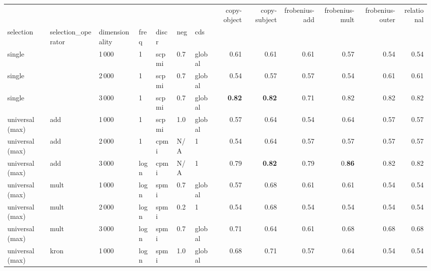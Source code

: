 \begin{tabular}{lllllllrrrrrr}
\toprule
       & {} &      &   &      &     &   &  copy-object &  copy-subject &  frobenius-add &  frobenius-mult &  frobenius-outer &  relational \\
selection & selection\_operator & dimensionality & freq & discr & neg & cds &              &               &                &                 &                  &             \\
\midrule
single                 & {}   & 1\,000 & 1    & scpmi & 0.7 & global &         0.61 &          0.61 &           0.61 &            0.57 &             0.54 &        0.54 \\
single                 & {}   & 2\,000 & 1    & scpmi & 0.7 & global &         0.54 &          0.57 &           0.57 &            0.54 &             0.61 &        0.61 \\
single                 & {}   & 3\,000 & 1    & scpmi & 0.7 & global &         \textbf{0.82} &          \textbf{0.82} &           0.71 &            0.82 &             0.82 &        0.82 \\ \addlinespace
universal (max)        & add  & 1\,000 & 1    & scpmi & 1.0 & global &         0.57 &          0.64 &           0.54 &            0.64 &             0.57 &        0.57 \\
universal (max)        & add  & 2\,000 & 1    & cpmi  & N/A & 1      &         0.54 &          0.64 &           0.57 &            0.57 &             0.57 &        0.57 \\
universal (max)        & add  & 3\,000 & logn & cpmi  & N/A & 1      &         0.79 &          \textbf{0.82} &           0.79 &            0.\textbf{86} &             0.82 &        0.82 \\ \addlinespace
universal (max)        & mult & 1\,000 & logn & spmi  & 0.7 & global &         0.57 &          0.68 &           0.61 &            0.61 &             0.54 &        0.54 \\
universal (max)        & mult & 2\,000 & logn & spmi  & 0.2 & 1      &         0.54 &          0.68 &           0.54 &            0.54 &             0.54 &        0.54 \\
universal (max)        & mult & 3\,000 & logn & spmi  & 0.7 & global &         0.71 &          0.64 &           0.61 &            0.68 &             0.68 &        0.68 \\ \addlinespace
universal (max)        & kron & 1\,000 & logn & spmi  & 1.0 & global &         0.68 &          0.71 &           0.57 &            0.64 &             0.54 &        0.54 \\

\end{tabular}
